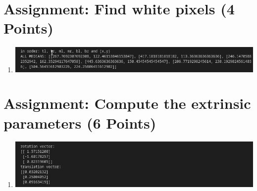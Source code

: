 \section{Assignment: Find white pixels (4 Points)}
\begin{enumerate}[]
    \item \includegraphics[width=1\textwidth]{src/u4/task4.png}
\end{enumerate}  

\section{Assignment: Compute the extrinsic parameters (6 Points)}
\begin{enumerate}[]
    \item \includegraphics[width=1\textwidth]{src/u4/task5.png}
\end{enumerate}  

